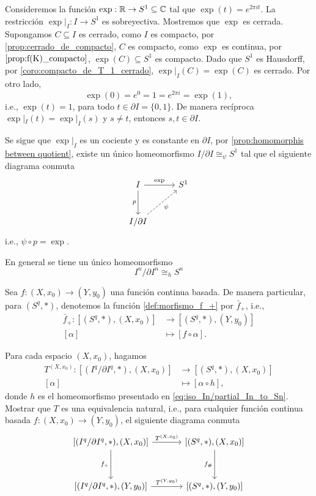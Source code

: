 \begin{nota}
    Consideremos la función $\exp:\mathbb{R}\to S^1\subseteq\mathbb{C}$ tal que $\exp(t)=e^{2\pi it}$. La restricción $\exp|_I:I\to S^1$ es sobreyectiva. Mostremos que $\exp$ es cerrada. Supongamos $C\subseteq I$ es cerrado, como $I$ es compacto, por \ref{prop:cerrado_de_compacto}, $C$ es compacto, como $\exp$ es continua, por $\ref{prop:f(K)_compacto}$, $\exp(C)\subseteq S^1$ es compacto. Dado que $S^1$ es Hausdorff, por \ref{coro:compacto_de_T_1_cerrado}, $\exp|_I(C)=\exp(C)$ es cerrado. Por otro lado,
    \[
    \exp(0)=e^{0}=1=e^{2\pi i}=\exp(1),
    \]
    i.e., $\exp(t)=1$, para todo $t\in\partial I=\{0,1\}$. De manera recíproca $\exp|_I(t)=\exp|_I(s)$ y $s\neq t$, entonces $s,t\in\partial I$.
    
    Se sigue que $\exp|_I$ es un cociente y es constante en $\partial I$, por \ref{prop:homomorphis between quotient}, existe un único homeomorfismo $I/\partial I\cong_{\psi} S^1$ tal que el siguiente diagrama conmuta 
    \[
    \begin{tikzcd}[column sep=1cm, row sep=1cm] 
        I\arrow[r,"\exp"] \arrow[d,"p"'] & S^1\\
        I/\partial I \arrow[ur, dashed, "\psi"']
    \end{tikzcd}
    \]
    i.e., $\psi\circ p=\exp$.

    En general se tiene un único homeomorfismo 
    \begin{equation}
    \label{eq:iso_In/partial_In_to_Sn}
        I^n/\partial I^n\cong_h S^n
    \end{equation}
\end{nota}
\begin{obs}
\label{obs:Pi_q(f)}
    Sea $f:(X,x_0)\to(Y,y_0)$ una función continua basada. De manera particular, para $(S^q,*)$, denotemos la función \ref{def:morfismo_f_+} por $\bar{f}_+$, i.e.,
\begin{align*}
    \bar{f}_+:[(S^q,*),(X,x_0)]
    &\longrightarrow [(S^q,*),(Y,y_0)]\\
    [\alpha]&\longmapsto [f\circ\alpha].
\end{align*}
\end{obs}
\begin{ejercicio}
    Para cada espacio $(X,x_0)$, hagamos 
    \begin{align*}
        T^{(X,x_0)}:[(I^q/\partial I^q,*),(X,x_0)]&\to[(S^q,*),(X,x_0)]\\
        [\alpha]&\mapsto [\alpha\circ h],
    \end{align*}
    donde $h$ es el homeomorfismo presentado en \ref{eq:iso_In/partial_In_to_Sn}. Mostrar que $T$ es una equivalencia natural, i.e., para cualquier función continua basada $f:(X,x_0)\to(Y,y_0)$, el siguiente diagrama conmuta 
     \[
    \begin{tikzcd}[column sep=1.2cm, row sep=1.2cm] 
        \bIq\arrow[r,"T^{(X,x_0)}"] \arrow[d,"f_+"'] & \text{[}(S^q,*),(X,x_0)\text{]}
        \arrow[d,"f_\#"']\\
        \YIq\arrow[r,"T^{(Y,y_0)}"] &\text{[}(S^q,*),(Y,y_0){]}
\end{tikzcd}
    \]
\end{ejercicio}
